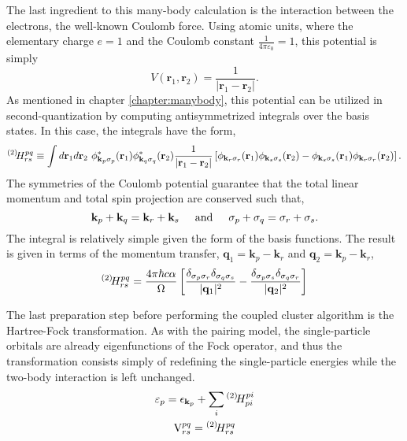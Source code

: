 \documentclass[thesis.tex]{subfiles}
\begin{document}
The last ingredient to this many-body calculation is the interaction between the electrons, the well-known Coulomb force.  Using atomic units, where the elementary charge $e = 1$ and the Coulomb constant $\frac{1}{4\pi\varepsilon_{0}} = 1$, this potential is simply
\begin{equation} \label{eq:coulomb}
  V\left( \mathbf{r}_{1}, \mathbf{r}_{2}\right) = \frac{1}{\lvert \mathbf{r}_{1} - \mathbf{r}_{2} \rvert}.
\end{equation}
As mentioned in chapter \ref{chapter:manybody}, this potential can be utilized in second-quantization by computing antisymmetrized integrals over the basis states.  In this case, the integrals have the form,
\begin{equation} \label{eq:coloumb_integral}
  {}^{\left(2\right)}\hspace{-2pt}H^{pq}_{rs} \equiv \int d\mathbf{r}_{1} d\mathbf{r}_{2}\  \phi^{*}_{\mathbf{k}_{p}\sigma_{p}}(\mathbf{r}_{1})\phi^{*}_{\mathbf{k}_{q}\sigma_{q}}(\mathbf{r}_{2}) \frac{1}{\lvert \mathbf{r}_{1} - \mathbf{r}_{2} \rvert} \left[\phi_{\mathbf{k}_{r}\sigma_{r}}(\mathbf{r}_{1})\phi_{\mathbf{k}_{s}\sigma_{s}}(\mathbf{r}_{2}) - \phi_{\mathbf{k}_{s}\sigma_{s}}(\mathbf{r}_{1})\phi_{\mathbf{k}_{r}\sigma_{r}}(\mathbf{r}_{2})\right].
\end{equation}
The symmetries of the Coulomb potential guarantee that the total linear momentum and total spin projection are conserved such that,
\begin{equation} \label{eq:coulomb-conserve}
  \mathbf{k}_{p} + \mathbf{k}_{q} = \mathbf{k}_{r} + \mathbf{k}_{s} \hspace{0.5cm} \text{and} \hspace{0.5cm} \sigma_{p} + \sigma_{q} = \sigma_{r} + \sigma_{s}.
\end{equation}
The integral is relatively simple given the form of the basis functions. The result is given in terms of the momentum transfer, $\mathbf{q}_{1} = \mathbf{k}_{p} - \mathbf{k}_{r}$ and $\mathbf{q}_{2} = \mathbf{k}_{p} - \mathbf{k}_{r}$,
\begin{equation} \label{eq:coulomb-int}
  {}^{\left(2\right)}\hspace{-2pt}H^{pq}_{rs} = \frac{4\pi \hbar c \alpha}{\Omega}\left[ \frac{\delta_{\sigma_{p}\sigma_{r}}\delta_{\sigma_{q}\sigma_{s}}}{\lvert \mathbf{q}_{1} \rvert^{2}} - \frac{\delta_{\sigma_{p}\sigma_{s}}\delta_{\sigma_{q}\sigma_{r}}}{\lvert \mathbf{q}_{2} \rvert^{2}} \right]
\end{equation}

The last preparation step before performing the coupled cluster algorithm is the Hartree-Fock transformation.  As with the pairing model, the single-particle orbitals are already eigenfunctions of the Fock operator, and thus the transformation consists simply of redefining the single-particle energies while the two-body interaction is left unchanged.
\begin{gather}\label{eq:infinite_hf}
  \varepsilon_{p} = \epsilon_{\mathbf{k}_{p}} + \sum_{i}{}^{\left(2\right)}\hspace{-2pt}H^{pi}_{pi} \notag \\
  \text{V}^{pq}_{rs} = {}^{\left(2\right)}\hspace{-2pt}H^{pq}_{rs}
\end{gather}
\end{document}
